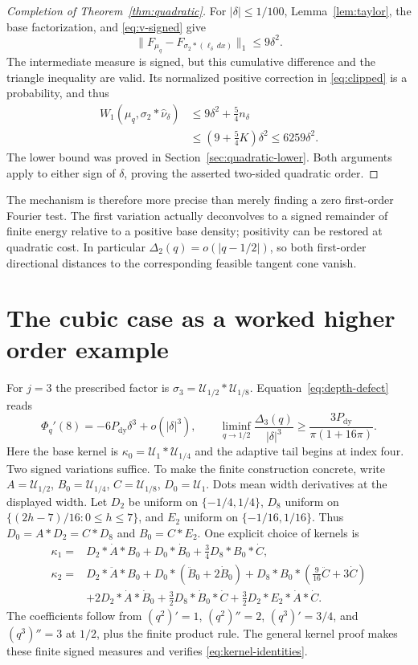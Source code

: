 \documentclass[11pt,letterpaper]{article}
\theoremstyle{remark}\newtheorem{remark}[theorem]{Remark}
\newcommand{\Un}{\mathcal U}\newcommand{\Law}{\mathcal L}
\begin{document}
\begin{proof}[Completion of Theorem~\ref{thm:quadratic}]
For $|\delta|\le1/100$, Lemma~\ref{lem:taylor}, the base factorization, and \eqref{eq:v-signed} give
\[
\|F_{\mu_q}-F_{\sigma_2*(\ell_\delta\,dx)}\|_1\le9\delta^2.
\]
The intermediate measure is signed, but this cumulative difference and the triangle inequality are valid. Its normalized positive correction in \eqref{eq:clipped} is a probability, and thus
\begin{align*}
W_1(\mu_q,\sigma_2*\widehat\nu_\delta)
&\le9\delta^2+\tfrac54n_\delta\\
&\le(9+\tfrac54K)\delta^2\le6259\delta^2.
\end{align*}
The lower bound was proved in Section~\ref{sec:quadratic-lower}. Both arguments apply to either sign of $\delta$, proving the asserted two-sided quadratic order.
\end{proof}

The mechanism is therefore more precise than merely finding a zero first-order Fourier test. The first variation actually deconvolves to a signed remainder of finite energy relative to a positive base density; positivity can be restored at quadratic cost. In particular $\Delta_2(q)=o(|q-1/2|)$, so both first-order directional distances to the corresponding feasible tangent cone vanish.

\section{The cubic case as a worked higher order example}\label{sec:cubic}

For $j=3$ the prescribed factor is $\sigma_3=\Un_{1/2}*\Un_{1/8}$. Equation~\eqref{eq:depth-defect} reads
\[
\Phi_q'(8)=-6P_{\mathrm{dy}}\delta^3+o(|\delta|^3),\qquad
\liminf_{q\to1/2}\frac{\Delta_3(q)}{|\delta|^3}
\ge\frac{3P_{\mathrm{dy}}}{\pi(1+16\pi)}.
\]
Here the base kernel is $\kappa_0=\Un_1*\Un_{1/4}$ and the adaptive tail begins at index four. Two signed variations suffice. To make the finite construction concrete, write
$A=\Un_{1/2}$, $B_0=\Un_{1/4}$, $C=\Un_{1/8}$, $D_0=\Un_1$.
Dots mean width derivatives at the displayed width. Let $D_2$ be uniform on $\{-1/4,1/4\}$, $D_8$ uniform on $\{(2h-7)/16:0\le h\le7\}$, and $E_2$ uniform on $\{-1/16,1/16\}$. Thus $D_0=A*D_2=C*D_8$ and $B_0=C*E_2$. One explicit choice of kernels is
\begin{align*}
\kappa_1={}&D_2*\dot A*B_0+D_0*\dot B_0+\tfrac34D_8*B_0*\dot C,\\
\kappa_2={}&D_2*\ddot A*B_0+D_0*(\ddot B_0+2\dot B_0)
 +D_8*B_0*(\tfrac9{16}\ddot C+3\dot C)\\
&+2D_2*\dot A*\dot B_0+\tfrac32D_8*\dot B_0*\dot C
 +\tfrac32D_2*E_2*\dot A*\dot C.
\end{align*}
The coefficients follow from $(q^2)'=1$, $(q^2)''=2$, $(q^3)'=3/4$, and $(q^3)''=3$ at $1/2$, plus the finite product rule. The general kernel proof makes these finite signed measures and verifies \eqref{eq:kernel-identities}.
\end{document}
